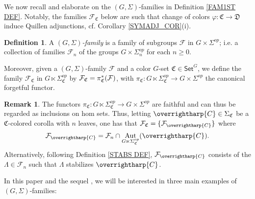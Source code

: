 \documentclass[a4paper,10pt
,draft
]{article}%
\numberwithin{equation}{section}
\numberwithin{figure}{section}
\theoremstyle{definition} %
\newtheorem{definition}[equation]{Definition}%
\newtheorem{remark}[equation]{Remark}%
\newcommand{\vect}[1]{\text{\overrightharp{\ensuremath{#1}}}}
\DeclareMathOperator{\Aut}{Aut}%
\newcommand{\F}{\ensuremath{\mathcal F}}
\newcommand{\1}{\ensuremath{\mathbbm 1}}%
\begin{document}
We now recall and elaborate on the $(G,\Sigma)$-families in Definition \ref{FAM1ST DEF}.
Notably, the families $\mathcal{F}_{\mathfrak{C}}$ below 
are such that 
change of colors $\varphi \colon \mathfrak{C} \to \mathfrak{D}$ 
induce Quillen adjunctions, cf. Corollary \ref{SYMADJ_COR}(i).




\begin{definition}\label{GSFAM_DEF}
	A \emph{$(G,\Sigma)$-family} is a family of subgroups $\mathcal{F}$ in $G \times \Sigma^{op}$;
	i.e.
	a collection of families $\F_n$ of the groups $G\times \Sigma_n^{op}$ for each $n \geq 0$.
	
	Moreover, given a $(G,\Sigma)$-family $\F$ and a color $G$-set $\mathfrak C \in \mathsf{Set}^G$,
	we define the family
	$\mathcal{F}_{\mathfrak{C}}$ in
	$G \ltimes \Sigma^{op}_{\mathfrak{C}}$
	by $\mathcal{F}_{\mathfrak{C}} = \pi^{\**}_{\mathfrak{C}}(\mathcal{F})$,
	with $\pi_{\mathfrak{C}} \colon G \ltimes \Sigma_{\mathfrak{C}}^{op} \to G \times \Sigma^{op}$
	the canonical forgetful functor.
\end{definition}






\begin{remark}\label{FAMC_DEF_REM}
	The functors
	$\pi_{\mathfrak{C}} \colon
	G \ltimes \Sigma_{\mathfrak{C}}^{op} \to
	G \times \Sigma^{op}$
	are faithful and can thus be regarded as inclusions on hom sets.
	Thus, letting $\vect{C} \in \Sigma_{\mathfrak{C}}$ be a
	$\mathfrak{C}$-colored corolla with $n$ leaves,
	one has that
	$\F_{\mathfrak{C}} = \{\F_{\vect{C}}\}$ where
	\begin{equation}\label{FAMC_DEF_EQ}
	\F_{\vect{C}} = \F_n \cap \Aut_{G \ltimes \Sigma_{\mathfrak C}^{op}}(\vect C).
	\end{equation}
	Alternatively, following
	Definition \ref{STABS DEF},
	$\F_{\vect{C}}$ consists of the $\Lambda \in \F_n$
	such that $\Lambda$ stabilizes $\vect{C}$.
\end{remark}



In this paper and the sequel \cite{BP_TAS}, 
we will be interested in three main examples of $(G,\Sigma)$-families:
\end{document}
